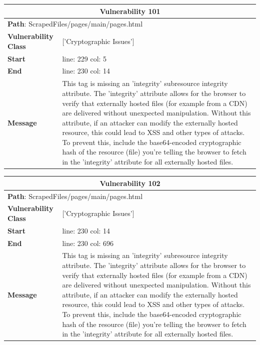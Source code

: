 \documentclass[12pt]{article}
\begin{document}
\vspace{0.7cm}
\FloatBarrier
\begin{table}[!h]
\centering
\renewcommand{\arraystretch}{1.3}
\begin{tabular}{|l|p{10cm}|}
\hline
\multicolumn{2}{|c|}{\textbf{Vulnerability 101}} \\
\hline
\multicolumn{2}{|l|}{\textbf{Path}: ScrapedFiles/pages/main/pages.html} \\
\hline
\textbf{Vulnerability Class} & ['Cryptographic Issues'] \\
\hline
\textbf{Start} & line: 229 \quad col: 5 \\
\hline
\textbf{End} & line: 230 \quad col: 14 \\
\hline
\textbf{Message} & This tag is missing an 'integrity' subresource integrity attribute. The 'integrity' attribute allows for the browser to verify that externally hosted files (for example from a CDN) are delivered without unexpected manipulation. Without this attribute, if an attacker can modify the externally hosted resource, this could lead to XSS and other types of attacks. To prevent this, include the base64-encoded cryptographic hash of the resource (file) you're telling the browser to fetch in the 'integrity' attribute for all externally hosted files. \\
\hline
\end{tabular}
\end{table}
\vspace{0.7cm}
\FloatBarrier
\begin{table}[!h]
\centering
\renewcommand{\arraystretch}{1.3}
\begin{tabular}{|l|p{10cm}|}
\hline
\multicolumn{2}{|c|}{\textbf{Vulnerability 102}} \\
\hline
\multicolumn{2}{|l|}{\textbf{Path}: ScrapedFiles/pages/main/pages.html} \\
\hline
\textbf{Vulnerability Class} & ['Cryptographic Issues'] \\
\hline
\textbf{Start} & line: 230 \quad col: 14 \\
\hline
\textbf{End} & line: 230 \quad col: 696 \\
\hline
\textbf{Message} & This tag is missing an 'integrity' subresource integrity attribute. The 'integrity' attribute allows for the browser to verify that externally hosted files (for example from a CDN) are delivered without unexpected manipulation. Without this attribute, if an attacker can modify the externally hosted resource, this could lead to XSS and other types of attacks. To prevent this, include the base64-encoded cryptographic hash of the resource (file) you're telling the browser to fetch in the 'integrity' attribute for all externally hosted files. \\
\hline
\end{tabular}
\end{table}
\end{document}
